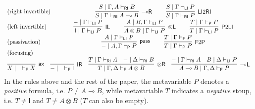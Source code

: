 \documentclass[copyright,creativecommons]{eptcs}
\theoremstyle{definition}
\newcommand{\tl}{\otimes \mathsf{L}}
\newcommand{\tr}{\otimes \mathsf{R}}
\newcommand{\lright}{{\multimap}\mathsf{R}}
\newcommand{\lleft}{{\multimap}\mathsf{L}}
\newcommand{\pass}{\mathsf{pass}}
\newcommand{\unitl}{\mathsf{IL}}
\newcommand{\unitr}{\mathsf{IR}}
\newcommand{\ax}{\mathsf{ax}}
\newcommand{\ot}{\otimes}
\newcommand{\lolli}{\multimap}
\newcommand{\I}{\mathsf{I}}
\newcommand{\RI}{\mathsf{RI}}
\newcommand{\LI}{\mathsf{LI}}
\newcommand{\Pass}{\mathsf{P}}
\newcommand{\F}{\mathsf{F}}
\newcommand{\proofbox}[1]{\begin{tabular}{l} #1 \end{tabular}}
\begin{document}
\begin{equation}\label{eq:naive}
  \begin{array}{lc}
    \text{(right invertible)} & %
    \proofbox{
    \infer[\lright]{S \mid \Gamma \vdash_{\RI} A \lolli B}{S \mid \Gamma , A \vdash_{\RI} B}
    \qquad
    \infer[\LI 2 \RI]{S \mid \Gamma \vdash_{\RI} P}{S \mid \Gamma \vdash_{\LI} P}
    }
    \\[6pt]
    \text{(left invertible)} & %
    \proofbox{
    \infer[\unitl]{\I \mid \Gamma \vdash_{\LI} P}{{-} \mid \Gamma \vdash_{\LI} P}
    \qquad
    \infer[\tl]{A \ot B \mid \Gamma \vdash_{\LI} P}{A \mid B , \Gamma \vdash_{\LI} P}
    \qquad
    \infer[\Pass 2 \LI]{T \mid \Gamma \vdash_{\LI} P}{T \mid \Gamma \vdash_{\Pass} P}
    }
    \\[6pt]
    \text{(passivation)} & %
    \proofbox{
      \infer[\pass]{{-} \mid A , \Gamma \vdash_{\Pass} P }{
      A\mid \Gamma \vdash_{\LI} P
    }
    \qquad
    \infer[\F 2 \Pass]{T \mid \Gamma \vdash_{\Pass} P}{
      T \mid \Gamma \vdash_{\F} P
    }
    }
    \\
    \text{(focusing)} &    \\ %
    \multicolumn{2}{c}{
    \infer[\ax]{X \mid \quad \vdash_{\F} X}{}
    \quad
    \infer[\unitr]{{-} \mid \quad \vdash_{\F} \I}{}
    \quad
    \infer[\tr]{T \mid \Gamma , \Delta \vdash_{\F} A \ot B}{
      T \mid \Gamma \vdash_{\RI} A
      &
      {-} \mid \Delta \vdash_{\RI} B
    }
    \quad
    \infer[\lleft]{A \lolli B \mid \Gamma , \Delta \vdash_{\F} P}{
      {-} \mid \Gamma \vdash_{\RI} A
      &
      B \mid \Delta \vdash_{\LI} P
    }
    }
  \end{array}
\end{equation}
In the rules above and the rest of the paper, the metavariable $P$ denotes a \emph{positive} formula, i.e. $P \not= A \lolli B$, while metavariable $T$ indicates a \emph{negative} stoup, i.e. $T \not= \I$ and $T\not= A \ot B$ ($T$ can also be empty).
\end{document}
